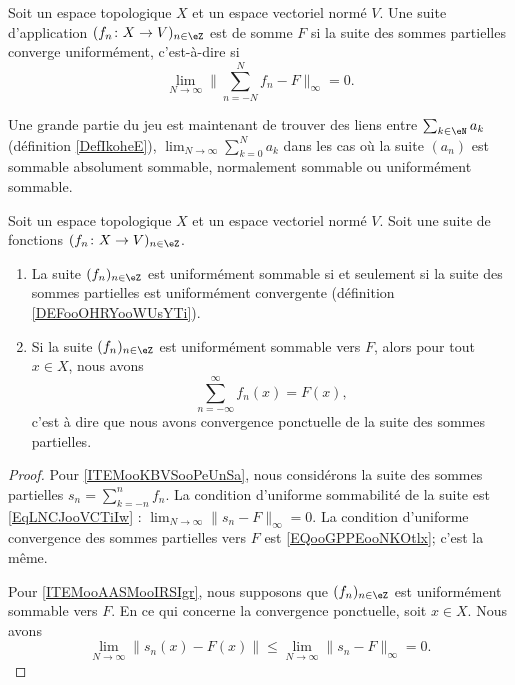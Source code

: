 \begin{definition}        \label{DEFooPABSooPMXMOV}
	Soit un espace topologique \( X\) et un espace vectoriel normé \( V\). Une suite d'application \( (f_n \colon X\to V)_{n\in \eZ}  \) est  de somme \( F\) si la suite des sommes partielles converge uniformément, c'est-à-dire si
	\begin{equation}        \label{EqLNCJooVCTiIw}
		\lim_{N\to \infty} \| \sum_{n=-N}^Nf_n-F \|_{\infty}=0.
	\end{equation}
\end{definition}

Une grande partie du jeu est maintenant de trouver des liens entre \( \sum_{k\in \eN}a_k\) (définition \ref{DefIkoheE}), \( \lim_{N\to \infty}\sum_{k=0}^Na_k\) dans les cas où la suite \( (a_n)\) est sommable absolument sommable, normalement sommable ou uniformément sommable.

\begin{proposition}	\label{PROPooYLCRooOXsOkb}
	Soit un espace topologique \( X\) et un espace vectoriel normé \( V\). Soit une suite de fonctions \( (f_n \colon X\to V )_{n\in \eZ}\).
	\begin{enumerate}
		\item		\label{ITEMooKBVSooPeUnSa}
		      La suite \( (f_n)_{n\in \eZ}\) est uniformément sommable si et seulement si la suite des sommes partielles est uniformément convergente (définition \ref{DEFooOHRYooWUsYTi}).
		\item		\label{ITEMooAASMooIRSIgr}
		      Si la suite \( (f_n)_{n\in\eZ}\) est uniformément sommable vers \( F\), alors pour tout \( x\in X\), nous avons
		      \begin{equation}
			      \sum_{n=-\infty}^{\infty}f_n(x)=F(x),
		      \end{equation}
		      c'est à dire que nous avons convergence ponctuelle de la suite des sommes partielles.
	\end{enumerate}
\end{proposition}

\begin{proof}
	Pour \ref{ITEMooKBVSooPeUnSa}, nous considérons la suite des sommes partielles \( s_n=\sum_{k=-n}^nf_n\). La condition d'uniforme sommabilité de la suite est \eqref{EqLNCJooVCTiIw} : \( \lim_{N\to \infty}\| s_n-F \|_{\infty}=0\). La condition d'uniforme convergence des sommes partielles vers \( F\) est \eqref{EQooGPPEooNKOtlx}; c'est la même.

	Pour \ref{ITEMooAASMooIRSIgr}, nous supposons que \( (f_n)_{n\in \eZ}\) est uniformément sommable vers \( F\). En ce qui concerne la convergence ponctuelle, soit \( x\in X\). Nous avons
	\begin{equation}
		\lim_{N\to \infty}\| s_n(x)-F(x) \|\leq \lim_{N\to \infty}\| s_n-F \|_{\infty}=0.
	\end{equation}
\end{proof}


